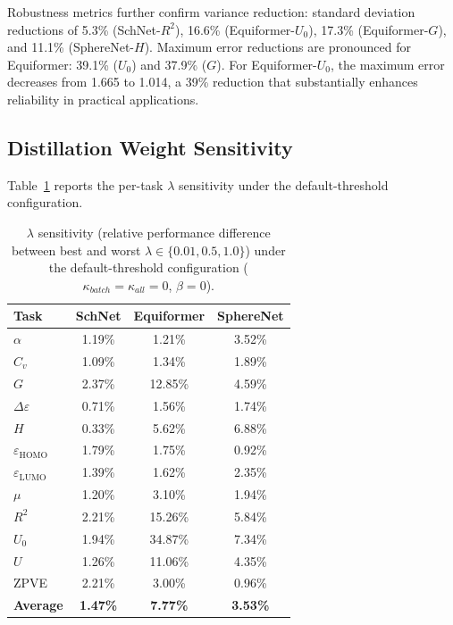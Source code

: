 Robustness metrics further confirm variance reduction: standard deviation reductions of 5.3\% (SchNet-$R^2$), 16.6\% (Equiformer-$U_0$), 17.3\% (Equiformer-$G$), and 11.1\% (SphereNet-$H$). Maximum error reductions are pronounced for Equiformer: 39.1\% ($U_0$) and 37.9\% ($G$). For Equiformer-$U_0$, the maximum error decreases from 1.665 to 1.014, a 39\% reduction that substantially enhances reliability in practical applications.


\subsection{Distillation Weight Sensitivity}
\label{sec:appendix_lambda}

Table~\ref{tab:lambda_sensitivity} reports the per-task $\lambda$ sensitivity under the default-threshold configuration.

\begin{table}[!htb]
  \scriptsize
  \centering
  \caption{$\lambda$ sensitivity (relative performance difference between best and worst $\lambda \in \{0.01, 0.5, 1.0\}$) under the default-threshold configuration ($\kappa_{batch}\!=\!\kappa_{all}\!=\!0$, $\beta\!=\!0$).}
  \label{tab:lambda_sensitivity}
    \begin{tabular}{lccc}
    \toprule
    \textbf{Task} & \textbf{SchNet} & \textbf{Equiformer} & \textbf{SphereNet} \\
    \midrule
    $\alpha$   & 1.19\% & 1.21\% & 3.52\% \\
    $C_v$      & 1.09\% & 1.34\% & 1.89\% \\
    $G$        & 2.37\% & 12.85\% & 4.59\% \\
    $\Delta\varepsilon$ & 0.71\% & 1.56\% & 1.74\% \\
    $H$        & 0.33\% & 5.62\% & 6.88\% \\
    $\varepsilon_{\text{HOMO}}$ & 1.79\% & 1.75\% & 0.92\% \\
    $\varepsilon_{\text{LUMO}}$ & 1.39\% & 1.62\% & 2.35\% \\
    $\mu$      & 1.20\% & 3.10\% & 1.94\% \\
    $R^2$      & 2.21\% & 15.26\% & 5.84\% \\
    $U_0$      & 1.94\% & 34.87\% & 7.34\% \\
    $U$        & 1.26\% & 11.06\% & 4.35\% \\
    ZPVE       & 2.21\% & 3.00\% & 0.96\% \\
    \midrule
    \textbf{Average} & \textbf{1.47\%} & \textbf{7.77\%} & \textbf{3.53\%} \\
    \bottomrule
    \end{tabular}
\end{table}


